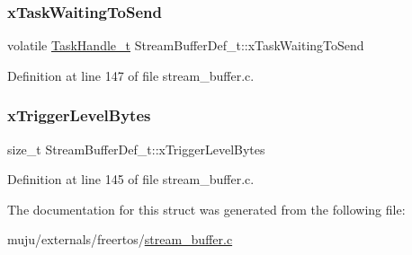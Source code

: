 \subsubsection{\texorpdfstring{x\+Task\+Waiting\+To\+Send}{xTaskWaitingToSend}}
{\footnotesize\ttfamily volatile \hyperlink{externals_2freertos_2include_2task_8h_a25b35e6e19ecf894173e7ff95edb96ef}{Task\+Handle\+\_\+t} Stream\+Buffer\+Def\+\_\+t\+::x\+Task\+Waiting\+To\+Send}



Definition at line 147 of file stream\+\_\+buffer.\+c.

\mbox{\label{struct_stream_buffer_def__t_a4a7ee9b374cc0b358d049811def8d595}} 
\subsubsection{\texorpdfstring{x\+Trigger\+Level\+Bytes}{xTriggerLevelBytes}}
{\footnotesize\ttfamily size\+\_\+t Stream\+Buffer\+Def\+\_\+t\+::x\+Trigger\+Level\+Bytes}



Definition at line 145 of file stream\+\_\+buffer.\+c.



The documentation for this struct was generated from the following file\+:\begin{DoxyCompactItemize}
\item 
muju/externals/freertos/\hyperlink{stream__buffer_8c}{stream\+\_\+buffer.\+c}\end{DoxyCompactItemize}
